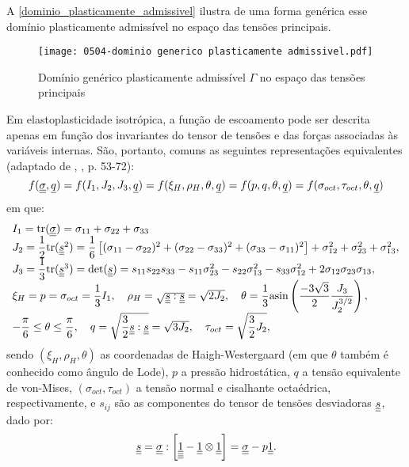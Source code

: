 A \autoref{dominio_plasticamente_admissivel} ilustra de uma forma genérica esse domínio plasticamente admissível no espaço das tensões principais.
\begin{figure}[H]
	\begin{center}
		\texttt{[image: 0504-dominio generico plasticamente admissivel.pdf]}
	\end{center}
	\caption{\label{dominio_plasticamente_admissivel}Domínio genérico plasticamente admissível $\Gamma$ no espaço das tensões principais}
\end{figure}
Em elastoplasticidade isotrópica, a função de escoamento pode ser descrita apenas em função dos invariantes do tensor de tensões e das forças associadas às variáveis internas. São, portanto, comuns as seguintes representações equivalentes (adaptado de \citeauthor{Chen1988}, \citeyear{Chen1988}, p. 53-72):
\begin{equation}
	\label{eq:funcoes_escoamento}
	f(\underline{\underline \sigma},\underline q) = f(I_1,J_2,J_3,\underline q) = f(\xi_{H},\rho_{H},\theta,\underline q) = f(p,q,\theta,\underline q) = f(\sigma_{oct},\tau_{oct},\theta,\underline q)
\end{equation}
em que:
\begin{equation}
	\label{eq:invariantes_tensores}
		\begin{array}{lcl}
			I_1 = \text{tr}(\underline{\underline \sigma}) = \sigma_{11}+\sigma_{22}+\sigma_{33}\\
			J_2 = \dfrac{1}{2}\text{tr}(\underline{\underline s}^2) = \dfrac{1}{6}\left[ (\sigma_{11}-\sigma_{22})^2 + (\sigma_{22}-\sigma_{33})^2 + (\sigma_{33}-\sigma_{11})^2 \right] + \sigma_{12}^2+ \sigma_{23}^2+ \sigma_{13}^2, \\
			J_3 = \dfrac{1}{3}\text{tr}(\underline{\underline s}^3) = \text{det}(\underline{\underline s}) = s_{11}s_{22}s_{33}-s_{11}\sigma_{23}^2-s_{22}\sigma_{13}^2-s_{33}\sigma_{12}^2+2\sigma_{12}\sigma_{23}\sigma_{13}, \\ 
			\xi_{H} = p = \sigma_{oct} = \dfrac{1}{3}I_1, ~~~ \rho_{H} = \sqrt{\underline{\underline s}:\underline{\underline s}} = \sqrt{2J_2}, ~~~ \theta = \dfrac{1}{3}\text{asin}\left( \dfrac{-3\sqrt{3}}{2} \dfrac{J_3}{J_2^{3/2}} \right), \\
			-\dfrac{\pi}{6} \le \theta \le \dfrac{\pi}{6}, ~~~ q = \sqrt{\dfrac{3}{2}\underline{\underline s}:\underline{\underline s}} = \sqrt{3J_2}, ~~~ \tau_{oct} = \sqrt{\dfrac{3}{2}J_2},
	\end{array}
\end{equation}
sendo $(\xi_H,\rho_H,\theta)$ as coordenadas de Haigh-Westergaard (em que $\theta$ também é conhecido como ângulo de Lode), $p$ a pressão hidrostática, $q$ a tensão equivalente de von-Mises, $(\sigma_{oct},\tau_{oct})$ a tensão normal e cisalhante octaédrica, respectivamente, e $s_{ij}$ são as componentes do tensor de tensões desviadoras $\underline{\underline s}$, dado por:
\begin{equation}
	\label{eq:tensor_desviador}
	\underline{\underline s} = \underline{\underline \sigma}: \left[ \underline{\underline{\underline{\underline 1}}}-\underline{\underline 1} \otimes \underline{\underline 1} \right] = \underline{\underline \sigma} - p\underline{\underline 1}.
\end{equation}

